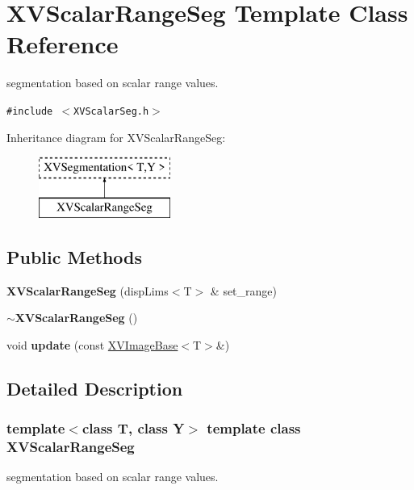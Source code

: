 \hypertarget{class_XVScalarRangeSeg}{
\section{XVScalar\-Range\-Seg  Template Class Reference}
\label{XVScalarRangeSeg}
}
segmentation based on scalar range values. 


{\tt \#include $<$XVScalar\-Seg.h$>$}

Inheritance diagram for XVScalar\-Range\-Seg:\begin{figure}[H]
\begin{center}
\leavevmode
\includegraphics[height=2cm]{class_XVScalarRangeSeg}
\end{center}
\end{figure}
\subsection*{Public Methods}
\begin{CompactItemize}
\item 
\label{XVScalarRangeSeg_a0}
\hypertarget{class_XVScalarRangeSeg_a0}{
{\bf XVScalar\-Range\-Seg} (disp\-Lims$<$T$>$ \& set\_\-range)}

\item 
{\bf $\sim$XVScalar\-Range\-Seg} ()
\item 
void {\bf update} (const \hyperlink{class_XVImageBase}{XVImage\-Base}$<$T$>$\&)
\end{CompactItemize}


\subsection{Detailed Description}
\subsubsection*{template$<$class T, class Y$>$  template class XVScalar\-Range\-Seg}

segmentation based on scalar range values.





